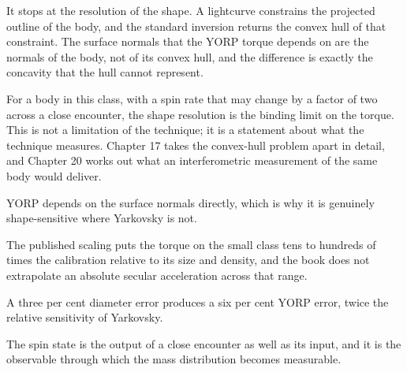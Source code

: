 It stops at the resolution of the shape. A lightcurve constrains the
projected outline of the body, and the standard inversion returns the convex
hull of that constraint. The surface normals that the YORP torque depends on
are the normals of the body, not of its convex hull, and the difference is
exactly the concavity that the hull cannot represent.

For a body in this class, with a spin rate that may change by a factor of
two across a close encounter, the shape resolution is the binding limit on
the torque. This is not a limitation of the technique; it is a statement
about what the technique measures. Chapter 17 takes the convex-hull problem
apart in detail, and Chapter 20 works out what an interferometric
measurement of the same body would deliver.

\begin{keytakeaways}
\item YORP depends on the surface normals directly, which is why it is
genuinely shape-sensitive where Yarkovsky is not.
\item The published scaling puts the torque on the small class tens to
hundreds of times the calibration relative to its size and density, and the
book does not extrapolate an absolute secular acceleration across that
range.
\item A three per cent diameter error produces a six per cent YORP error,
twice the relative sensitivity of Yarkovsky.
\item The spin state is the output of a close encounter as well as its input,
and it is the observable through which the mass distribution becomes
measurable.
\end{keytakeaways}
